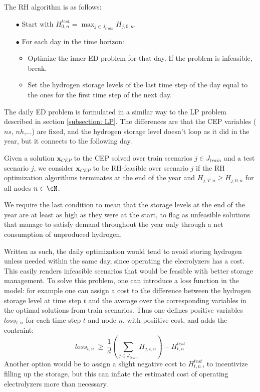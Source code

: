 \documentclass[smallextended,natbib]{svjour3}       %
\numberwithin{theorem}{section}
\begin{document}
The RH algorithm is as follows:
\begin{itemize}
\item[$\bullet$] Start with $H_{0,n}^{test} = \max_{j\in J_{train}} H_{j,0,n}$.
\item[$\bullet$] For each day in the time horizon:
\begin{itemize}
\item Optimize the inner ED problem for that day. If the problem is infeasible, break.
\item Set the hydrogen storage levels of the last time step of the day equal to the ones for the first time step of the next day.
\end{itemize}
\end{itemize}

The daily ED problem is formulated in a similar way to the LP problem described in section \ref{subsection: LP}. 
The differences are that the CEP variables ($ns$, $nh$,...) are fixed, and the hydrogen storage level doesn't loop as it did in the year, but it connects to the following day.

\begin{definition}[RH-feasibility]
  Given a solution $\mathbf{x}_{CEP}$ to the CEP solved over train scenarios $j\in J_{train}$ and a test scenario $j$, we consider $\mathbf{x}_{CEP}$ to be RH-feasible over scenario $j$ if the RH optimization algorithms terminates at the end of the year and $H_{j,T,n}\ge H_{j,0,n}$ for all nodes $n\in\cN$.
  \end{definition}
We require the last condition to mean that the storage levels at the end of the year are at least as high as they were at the start, to flag as unfeasible solutions that manage to satisfy demand throughout the year only through a net consumption of unproduced hydrogen.
  
Written as such, the daily optimization would tend to avoid storing hydrogen unless needed within the same day, since operating the elecrolyzers has a cost. 
This easily renders infeasible scenarios that would be feasible with better storage management. 
To solve this problem, one can introduce a loss function in the model: for example one can assign a cost to the difference between the hydrogen storage level at time step $t$ and the average over the corresponding variables in the optimal solutions from train scenarios. 
Thus one defines positive variables $loss_{t,n}$ for each time step $t$ and node $n$, with posiitive cost, and adds the contraint:
\begin{equation}
loss_{t,n}\ \ge\ \frac{1}{d}\left(\sum_{j\in J_{train}}H_{j,t,n}\right) - H^{test}_{t,n} 
\end{equation}
Another option would be to assign a slight negative cost to $H^{test}_{t,n}$, to incentivize filling up the storage, but this can inflate the estimated cost of operating electrolyzers more than necessary.
\end{document}
